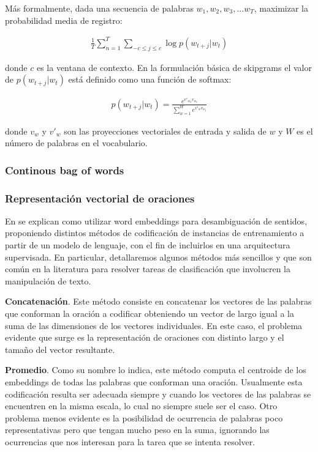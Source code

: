 Más formalmente, dada una secuencia de palabras $w_1, w_2, w_3, ... w_T$,
maximizar la probabilidad media de registro:

\begin{align*}
    \frac{1}{T} \sum_{n=1}^{T} 
                    \sum_{-c \leq j \leq c} \log p(w_{t+j} | w_t)
\end{align*}

donde $c$ es la ventana de contexto. En la formulación básica de skipgrams el
valor de $p(w_{t+j}|w_{t})$ está definido como una función de softmax:

\begin{align*}
    p(w_{t+j}|w_{t}) = \frac{e^{v'_{w_O} v_{w_I}}}{\sum_{w=1}^{W} e^{v'_{w} v_{w_I}}}
\end{align*}

donde $v_w$ y $v'_w$ son las proyecciones vectoriales de entrada y salida de $w$
y $W$ es el número de palabras en el vocabulario.

\subsubsection{Continous bag of words}

\subsubsection{Representación vectorial de oraciones}

En \citep{Iacobacci-2016} se explican como utilizar word embeddings para
desambiguación de sentidos, proponiendo distintos métodos de codificación de
instancias de entrenamiento a partir de un modelo de lenguaje, con el fin
de incluirlos en una arquitectura supervisada. En particular, detallaremos
algunos métodos más sencillos y que son común en la literatura para resolver
tareas de clasificación que involucren la manipulación de texto.

\textbf{Concatenación}. Este método consiste en concatenar los vectores de las
palabras que conforman la oración a codificar obteniendo un vector de largo
igual a la suma de las dimensiones de los vectores individuales. En este caso,
el problema evidente que surge es la representación de oraciones con distinto
largo y el tamaño del vector resultante.

\textbf{Promedio}. Como su nombre lo indica, este método computa el centroide de
los embeddings de todas las palabras que conforman una oración. Usualmente esta
codificación resulta ser adecuada siempre y cuando los vectores de las palabras
se encuentren en la misma escala, lo cual no siempre suele ser el caso. Otro
problema menos evidente es la posibilidad de ocurrencia de palabras poco
representativas pero que tengan mucho peso en la suma, ignorando las ocurrencias
que nos interesan para la tarea que se intenta resolver.

